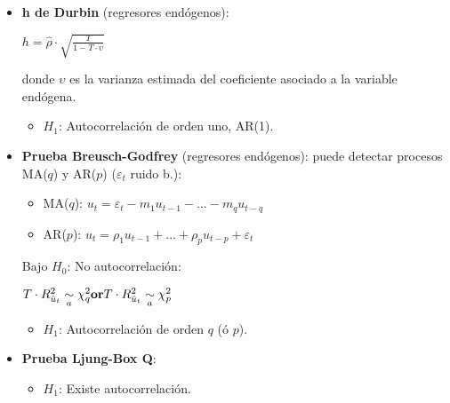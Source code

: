 \documentclass[10pt, a4paper, landscape]{extarticle}
\begin{document}
\begin{multicols}{3}
\begin{itemize}[leftmargin=*]
\begin{itemize}[leftmargin=*]
\begin{center}
				\end{center}
				\item \textbf{h de Durbin} (regresores endógenos):
				\begin{center}
					$h = \hat{\rho} \cdot \sqrt{\frac{T}{1 - T \cdot \upsilon}}$
				\end{center}
				donde $\upsilon$ es la varianza estimada del coeficiente asociado a la variable endógena.
				\begin{itemize}[leftmargin=*]
					\item $H_1$: Autocorrelación de orden uno, AR(1).
				\end{itemize}
				\item \textbf{Prueba Breusch-Godfrey} (regresores endógenos): puede detectar procesos MA($q$) y AR($p$) ($\varepsilon_t$ ruido b.):
				\begin{itemize}[leftmargin=*]
					\item MA($q$): $u_t = \varepsilon_t - m_1 u_{t-1} - ... - m_q u_{t-q}$
					\item AR($p$): $u_t = \rho_1 u_{t-1} + ... + \rho_p u_{t-p} + \varepsilon_t$
				\end{itemize}
				Bajo $H_0$: No autocorrelación:
				\begin{center}
					$\hfill T \cdot R^2_{\hat{u}_t} \underset{a}{\sim} \chi^2_q \hfill \textbf{or} \hfill T \cdot R^2_{\hat{u}_t} \underset{a}{\sim} \chi^2_p \hfill$
				\end{center}
				\begin{itemize}[leftmargin=*]
					\item $H_1$: Autocorrelación de orden $q$ (ó $p$).
				\end{itemize}
				\item \textbf{Prueba Ljung-Box Q}:
				\begin{itemize}[leftmargin=*]
					\item $H_1$: Existe autocorrelación.
				\end{itemize}
			\end{itemize}
		\end{itemize}

\end{multicols}
\end{document}
